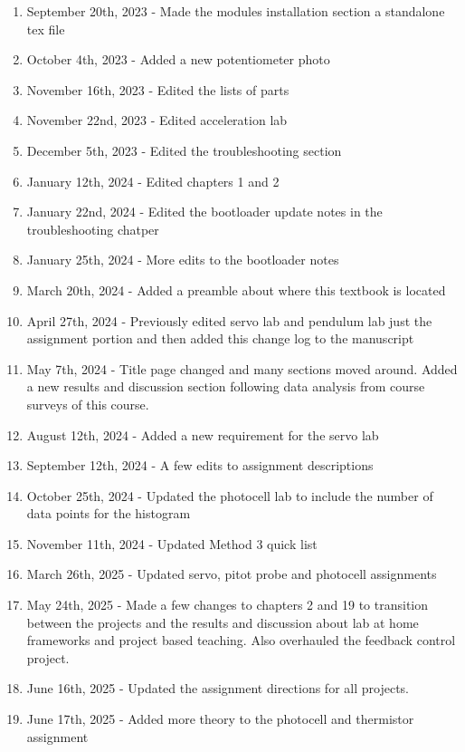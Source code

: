 \documentclass{article}
\begin{document}
\begin{enumerate}[itemsep=-5pt]
\item September 20th, 2023 - Made the modules installation section a standalone tex file
\item October 4th, 2023 - Added a new potentiometer photo
\item November 16th, 2023 - Edited the lists of parts 
\item November 22nd, 2023 - Edited acceleration lab
\item December 5th, 2023 - Edited the troubleshooting section
\item January 12th, 2024 - Edited chapters 1 and 2
\item January 22nd, 2024 - Edited the bootloader update notes in the troubleshooting chatper
\item January 25th, 2024 - More edits to the bootloader notes
\item March 20th, 2024 - Added a preamble about where this textbook is located
\item April 27th, 2024 - Previously edited servo lab and pendulum lab just the assignment portion and then added this change log to the manuscript
\item May 7th, 2024 - Title page changed and many sections moved around. Added a new results and discussion section following data analysis from course surveys of this course.
\item August 12th, 2024 - Added a new requirement for the servo lab
\item September 12th, 2024 - A few edits to assignment descriptions
\item October 25th, 2024 - Updated the photocell lab to include the number of data points for the histogram
\item November 11th, 2024 - Updated Method 3 quick list
\item March 26th, 2025 - Updated servo, pitot probe and photocell assignments
\item May 24th, 2025 - Made a few changes to chapters 2 and 19 to transition between the projects and the results and discussion about lab at home frameworks and project based teaching. Also overhauled the feedback control project. 
\item June 16th, 2025 - Updated the assignment directions for all projects.
\item June 17th, 2025 - Added more theory to the photocell and thermistor assignment
\end{enumerate}

\newpage

\tableofcontents

\newpage













\end{document}
